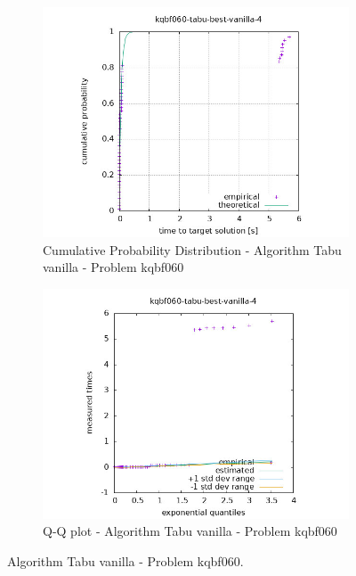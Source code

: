 \begin{figure}[H]
    \centering
    \begin{subfigure}{0.49\textwidth}
        \includegraphics[width=\textwidth]{figure/ttt_plot/kqbf060-tabu-best-vanilla-4-exp.jpeg}
        \caption{Cumulative Probability Distribution - Algorithm Tabu vanilla - Problem kqbf060}
        \label{fig:tabu-vanilla-kqbf060-exp}
    \end{subfigure}
    \hfill
    \begin{subfigure}{0.49\textwidth}
        \includegraphics[width=\textwidth]{figure/ttt_plot/kqbf060-tabu-best-vanilla-4-qq.jpeg}
        \caption{Q-Q plot - Algorithm Tabu vanilla - Problem kqbf060}
        \label{fig:tabu-vanilla-kqbf060-qq}
    \end{subfigure}
    \caption{Algorithm Tabu vanilla - Problem kqbf060.}
    \label{fig:tabu-vanilla-kqbf060}
\end{figure}


